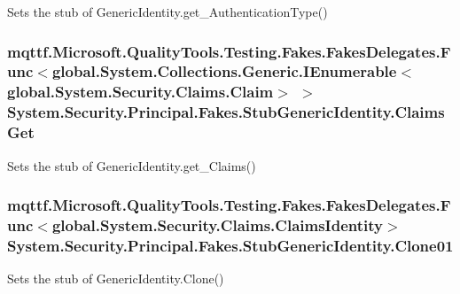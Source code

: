 Sets the stub of Generic\-Identity.\-get\-\_\-\-Authentication\-Type()

\hypertarget{class_system_1_1_security_1_1_principal_1_1_fakes_1_1_stub_generic_identity_a43231926ca941b74fa5ded86781d6d8f}{
\subsubsection[{Claims\-Get}]{\setlength{\rightskip}{0pt plus 5cm}mqttf.\-Microsoft.\-Quality\-Tools.\-Testing.\-Fakes.\-Fakes\-Delegates.\-Func$<$global.\-System.\-Collections.\-Generic.\-I\-Enumerable$<$global.\-System.\-Security.\-Claims.\-Claim$>$ $>$ System.\-Security.\-Principal.\-Fakes.\-Stub\-Generic\-Identity.\-Claims\-Get}}\label{class_system_1_1_security_1_1_principal_1_1_fakes_1_1_stub_generic_identity_a43231926ca941b74fa5ded86781d6d8f}


Sets the stub of Generic\-Identity.\-get\-\_\-\-Claims()

\hypertarget{class_system_1_1_security_1_1_principal_1_1_fakes_1_1_stub_generic_identity_a8baa58d6daef8a0ec155d8e7da5a2340}{
\subsubsection[{Clone01}]{\setlength{\rightskip}{0pt plus 5cm}mqttf.\-Microsoft.\-Quality\-Tools.\-Testing.\-Fakes.\-Fakes\-Delegates.\-Func$<$global.\-System.\-Security.\-Claims.\-Claims\-Identity$>$ System.\-Security.\-Principal.\-Fakes.\-Stub\-Generic\-Identity.\-Clone01}}\label{class_system_1_1_security_1_1_principal_1_1_fakes_1_1_stub_generic_identity_a8baa58d6daef8a0ec155d8e7da5a2340}


Sets the stub of Generic\-Identity.\-Clone()

